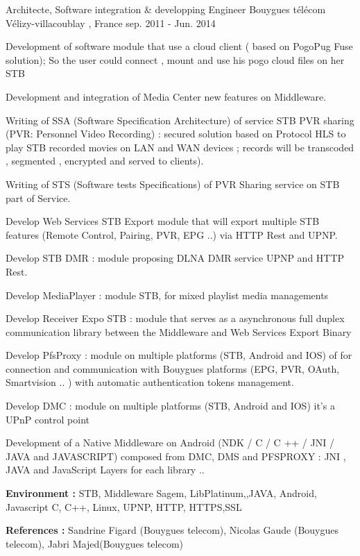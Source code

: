 \documentclass[11pt, a4paper]{awesome-cv} %
\begin{document}
\begin{cventries}
    \cventry
    {Architecte, Software integration \& developping Engineer} %
    {Bouygues télécom} %
    {Vélizy-villacoublay , France} %
    {sep. 2011 - Jun. 2014} %
    { %
        \begin{cvitems}
            \item {Development of software module that use a cloud client ( based on PogoPug Fuse solution); So the user could connect , mount  and use his pogo cloud files on her STB}
            \item {Development and integration of Media Center new features on Middleware.}
            \item {Writing of SSA  (Software Specification Architecture) of service STB PVR sharing (PVR: Personnel Video Recording)  : secured solution based on Protocol HLS  to play STB recorded movies on LAN and WAN devices ; records will be transcoded , segmented , encrypted and served to clients).}
            \item {Writing of STS (Software tests Specifications) of PVR Sharing service on STB part of Service.  }
            \item {Develop Web Services STB Export module that will export multiple STB features (Remote Control, Pairing, PVR, EPG ..) via HTTP Rest and UPNP. }
            \item {Develop STB DMR : module proposing DLNA DMR service UPNP  and HTTP Rest. }
            \item {Develop MediaPlayer : module STB, for mixed playlist media managements}
            \item {Develop Receiver Expo STB : module that serves as a asynchronous full duplex communication library between the Middleware and Web Services Export Binary}
            \item {Develop PfsProxy : module on multiple platforms (STB, Android and IOS) of for connection and communication with Bouygues platforms (EPG, PVR, OAuth, Smartvision .. ) with automatic authentication tokens management.}
            \item {Develop DMC : module on multiple platforms (STB, Android and IOS)  it’s a UPnP control point }
            \item {Development of a Native Middleware on Android (NDK / C / C ++ / JNI / JAVA and JAVASCRIPT) composed from  DMC, DMS and PFSPROXY :
                        JNI , JAVA and JavaScript Layers for each library ..}
            \item { \textbf{Environment :} STB, Middleware Sagem, LibPlatinum,,JAVA, Android, Javascript C, C++, Linux, UPNP, HTTP, HTTPS,SSL }
            \item { \textbf{References :}  Sandrine Figard (Bouygues telecom), Nicolas Gaude (Bouygues telecom), Jabri Majed(Bouygues telecom) }
        \end{cvitems}
    }



\end{cventries}
\end{document}
